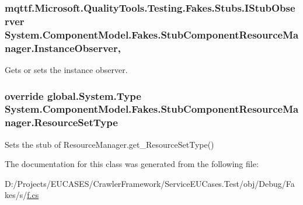 \hypertarget{class_system_1_1_component_model_1_1_fakes_1_1_stub_component_resource_manager_a448bed32f4d945a969f355dc75546ea6}{
\subsubsection[{Instance\-Observer}]{\setlength{\rightskip}{0pt plus 5cm}mqttf.\-Microsoft.\-Quality\-Tools.\-Testing.\-Fakes.\-Stubs.\-I\-Stub\-Observer System.\-Component\-Model.\-Fakes.\-Stub\-Component\-Resource\-Manager.\-Instance\-Observer\hspace{0.3cm}{\ttfamily [get]}, {\ttfamily [set]}}}\label{class_system_1_1_component_model_1_1_fakes_1_1_stub_component_resource_manager_a448bed32f4d945a969f355dc75546ea6}


Gets or sets the instance observer.

\hypertarget{class_system_1_1_component_model_1_1_fakes_1_1_stub_component_resource_manager_a035e62acb14e3972b7ade7e294db1b2b}{
\subsubsection[{Resource\-Set\-Type}]{\setlength{\rightskip}{0pt plus 5cm}override global.\-System.\-Type System.\-Component\-Model.\-Fakes.\-Stub\-Component\-Resource\-Manager.\-Resource\-Set\-Type\hspace{0.3cm}{\ttfamily [get]}}}\label{class_system_1_1_component_model_1_1_fakes_1_1_stub_component_resource_manager_a035e62acb14e3972b7ade7e294db1b2b}


Sets the stub of Resource\-Manager.\-get\-\_\-\-Resource\-Set\-Type()



The documentation for this class was generated from the following file\-:\begin{DoxyCompactItemize}
\item 
D\-:/\-Projects/\-E\-U\-C\-A\-S\-E\-S/\-Crawler\-Framework/\-Service\-E\-U\-Cases.\-Test/obj/\-Debug/\-Fakes/s/\hyperlink{s_2f_8cs}{f.\-cs}\end{DoxyCompactItemize}
